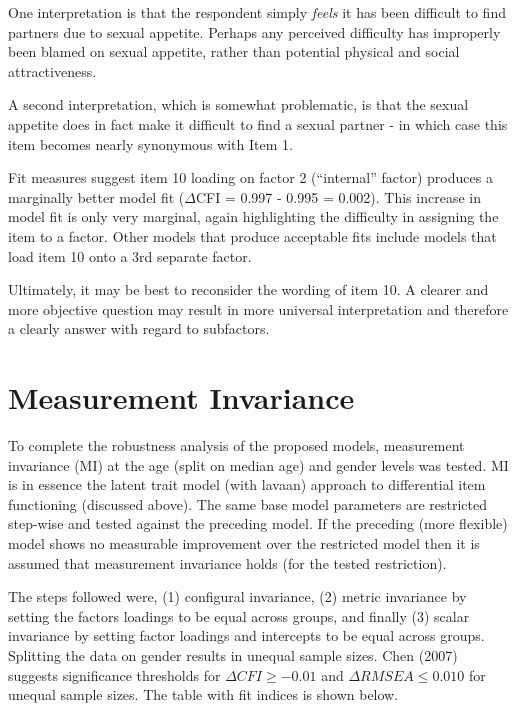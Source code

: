 \documentclass[
  man,floatsintext]{apa6}
\begin{document}
One interpretation is that the respondent simply \emph{feels} it has been difficult to find partners due to sexual appetite. Perhaps any perceived difficulty has improperly been blamed on sexual appetite, rather than potential physical and social attractiveness.

A second interpretation, which is somewhat problematic, is that the sexual appetite does in fact make it difficult to find a sexual partner - in which case this item becomes nearly synonymous with Item 1.

Fit measures suggest item 10 loading on factor 2 (``internal'' factor) produces a marginally better model fit (\(\Delta\)CFI = 0.997 - 0.995 = 0.002). This increase in model fit is only very marginal, again highlighting the difficulty in assigning the item to a factor. Other models that produce acceptable fits include models that load item 10 onto a 3rd separate factor.

Ultimately, it may be best to reconsider the wording of item 10. A clearer and more objective question may result in more universal interpretation and therefore a clearly answer with regard to subfactors.

\hypertarget{measurement-invariance}{%
\section{Measurement Invariance}\label{measurement-invariance}}

To complete the robustness analysis of the proposed models, measurement invariance (MI) at the age (split on median age) and gender levels was tested. MI is in essence the latent trait model (with lavaan) approach to differential item functioning (discussed above). The same base model parameters are restricted step-wise and tested against the preceding model. If the preceding (more flexible) model shows no measurable improvement over the restricted model then it is assumed that measurement invariance holds (for the tested restriction).

The steps followed were, (1) configural invariance, (2) metric invariance by setting the factors loadings to be equal across groups, and finally (3) scalar invariance by setting factor loadings and intercepts to be equal across groups. Splitting the data on gender results in unequal sample sizes. Chen (2007) suggests significance thresholds for \(\Delta CFI \geq -0.01\) and \(\Delta RMSEA \leq 0.010\) for unequal sample sizes. The table with fit indices is shown below.
\end{document}
